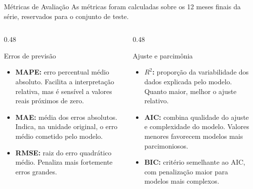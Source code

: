 \documentclass[10pt, aspectratio=169]{beamer}
\begin{document}
\begin{frame}{Métricas de Avaliação}
    \small
    As métricas foram calculadas sobre os 12 meses finais da série, reservados para o conjunto de teste.
    
    \vspace{0.25cm}
    \begin{columns}[T,onlytextwidth]
        \begin{column}{0.48\textwidth}
            \begin{block}{Erros de previsão}
                \begin{itemize}
                    \item \textbf{MAPE:} erro percentual médio absoluto. Facilita a interpretação relativa, mas é sensível a valores reais próximos de zero.
                    \item \textbf{MAE:} média dos erros absolutos. Indica, na unidade original, o erro médio cometido pelo modelo.
                    \item \textbf{RMSE:} raiz do erro quadrático médio. Penaliza mais fortemente erros grandes.
                \end{itemize}
            \end{block}
        \end{column}
        \begin{column}{0.48\textwidth}
            \begin{block}{Ajuste e parcimônia}
                \begin{itemize}
                    \item \textbf{$R^2$:} proporção da variabilidade dos dados explicada pelo modelo. Quanto maior, melhor o ajuste relativo.
                    \item \textbf{AIC:} combina qualidade do ajuste e complexidade do modelo. Valores menores favorecem modelos mais parcimoniosos.
                    \item \textbf{BIC:} critério semelhante ao AIC, com penalização maior para modelos mais complexos.
                \end{itemize}
            \end{block}
        \end{column}
    \end{columns}
    
    \vspace{0.2cm}
\end{frame}
\end{document}
